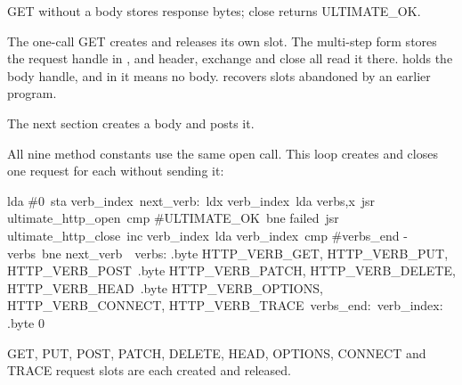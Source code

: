 \begin{resultbox}
GET without a body stores response bytes; close returns ULTIMATE_OK.
\end{resultbox}

The one-call GET creates and releases its own slot. The multi-step form stores
the request handle in , and header, exchange and close all read
it there.  holds the body handle, and
 in it means no body.
 recovers slots abandoned by an earlier
program.

The next section creates a body and posts it.

All nine method constants use the same open call. This loop creates and closes
one request for each without sending it:

\begin{listingbox}
\hspace*{2em}lda \#0\
\hspace*{2em}sta verb\_index\
next\_verb:\
\hspace*{2em}ldx verb\_index\
\hspace*{2em}lda verbs,x\
\hspace*{2em}jsr ultimate\_http\_open\
\hspace*{2em}cmp \#ULTIMATE\_OK\
\hspace*{2em}bne failed\
\hspace*{2em}jsr ultimate\_http\_close\
\hspace*{2em}inc verb\_index\
\hspace*{2em}lda verb\_index\
\hspace*{2em}cmp \#verbs\_end - verbs\
\hspace*{2em}bne next\_verb\
\
verbs: .byte HTTP\_VERB\_GET, HTTP\_VERB\_PUT, HTTP\_VERB\_POST\
\hspace*{4.2em}.byte HTTP\_VERB\_PATCH, HTTP\_VERB\_DELETE, HTTP\_VERB\_HEAD\
\hspace*{4.2em}.byte HTTP\_VERB\_OPTIONS, HTTP\_VERB\_CONNECT, HTTP\_VERB\_TRACE\
verbs\_end:\
verb\_index: .byte 0
\end{listingbox}

\begin{resultbox}
GET, PUT, POST, PATCH, DELETE, HEAD, OPTIONS, CONNECT and TRACE request slots
are each created and released.
\end{resultbox}


